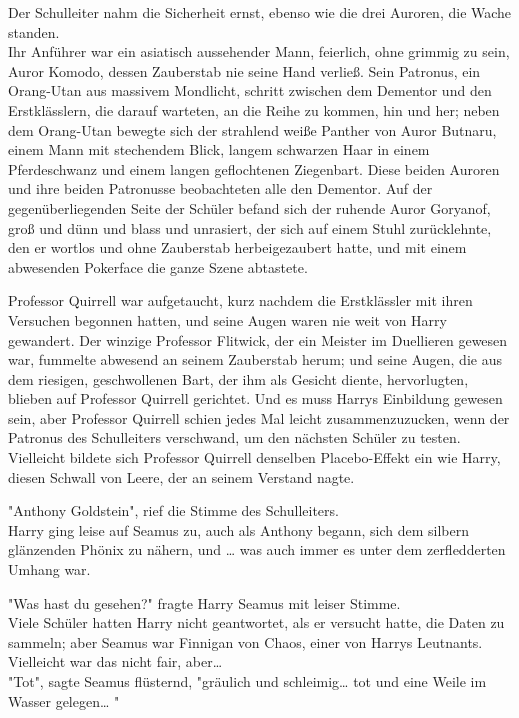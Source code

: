 {Der Schulleiter nahm die Sicherheit ernst, ebenso wie die drei Auroren, die Wache standen.\\ Ihr Anführer war ein asiatisch aussehender Mann, feierlich, ohne grimmig zu sein, Auror Komodo, dessen Zauberstab nie seine Hand verließ. Sein Patronus, ein Orang-Utan aus massivem Mondlicht, schritt zwischen dem Dementor und den Erstklässlern, die darauf warteten, an die Reihe zu kommen, hin und her; neben dem Orang-Utan bewegte sich der strahlend weiße Panther von Auror Butnaru, einem Mann mit stechendem Blick, langem schwarzen Haar in einem Pferdeschwanz und einem langen geflochtenen Ziegenbart. Diese beiden Auroren und ihre beiden Patronusse beobachteten alle den Dementor. Auf der gegenüberliegenden Seite der Schüler befand sich der ruhende Auror Goryanof, groß und dünn und blass und unrasiert, der sich auf einem Stuhl zurücklehnte, den er wortlos und ohne Zauberstab herbeigezaubert hatte, und mit einem abwesenden Pokerface die ganze Szene abtastete.

Professor Quirrell war aufgetaucht, kurz nachdem die Erstklässler mit ihren Versuchen begonnen hatten, und seine Augen waren nie weit von Harry gewandert. Der winzige Professor Flitwick, der ein Meister im Duellieren gewesen war, fummelte abwesend an seinem Zauberstab herum; und seine Augen, die aus dem riesigen, geschwollenen Bart, der ihm als Gesicht diente, hervorlugten, blieben auf Professor Quirrell gerichtet. Und es muss Harrys Einbildung gewesen sein, aber Professor Quirrell schien jedes Mal leicht zusammenzuzucken, wenn der Patronus des Schulleiters verschwand, um den nächsten Schüler zu testen. Vielleicht bildete sich Professor Quirrell denselben Placebo-Effekt ein wie Harry, diesen Schwall von Leere, der an seinem Verstand nagte.

"Anthony Goldstein", rief die Stimme des Schulleiters.\\ Harry ging leise auf Seamus zu, auch als Anthony begann, sich dem silbern glänzenden Phönix zu nähern, und … was auch immer es unter dem zerfledderten Umhang war.

"Was hast du gesehen?" fragte Harry Seamus mit leiser Stimme.\\ Viele Schüler hatten Harry nicht geantwortet, als er versucht hatte, die Daten zu sammeln; aber Seamus war Finnigan von Chaos, einer von Harrys Leutnants. Vielleicht war das nicht fair, aber…\\ "Tot", sagte Seamus flüsternd, "gräulich und schleimig… tot und eine Weile im Wasser gelegen… "

}
